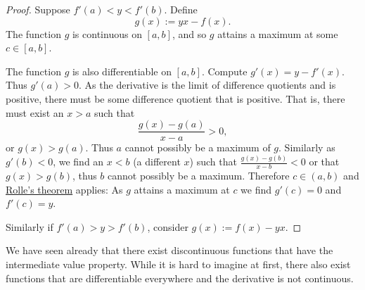 \documentclass[12pt]{book}
\theoremstyle{plain}
\theoremstyle{remark}
\theoremstyle{definition}
\theoremstyle{exercise}
\theoremstyle{example}
\begin{document}
\begin{proof}
Suppose 
$f'(a) < y < f'(b)$.
Define
\begin{equation*}
g(x) := yx - f(x) .
\end{equation*}
The function $g$ is continuous on $[a,b]$, and so $g$ attains a maximum at some $c \in
[a,b]$.

The function $g$ is also differentiable on $[a,b]$.
Compute $g'(x) = y-f'(x)$.  Thus $g'(a) > 0$.  As the derivative is
the limit of difference quotients and is positive, there must be some
difference quotient that is positive.  That is, there must exist
an $x > a$ such that
\begin{equation*}
\frac{g(x)-g(a)}{x-a} > 0 ,
\end{equation*}
or $g(x) > g(a)$.  Thus $a$
cannot possibly be a maximum of $g$.  Similarly as $g'(b) < 0$,
we find an $x < b$ (a different $x$) such that
$\frac{g(x)-g(b)}{x-b} < 0$ or that $g(x) > g(b)$, thus
$b$ cannot possibly be a maximum.
Therefore $c \in (a,b)$
and \hyperref[thm:rolle]{Rolle's theorem} applies: As $g$ attains a maximum
at $c$ we find $g'(c) = 0$
and $f'(c) = y$.

Similarly if $f'(a) > y > f'(b)$, consider $g(x) := f(x)- yx$.
\end{proof}

We have seen already that
there exist discontinuous functions that have the
intermediate value property.  While it is hard to imagine at first, there
also
exist functions that are differentiable everywhere and the derivative is not
continuous.
\end{document}
